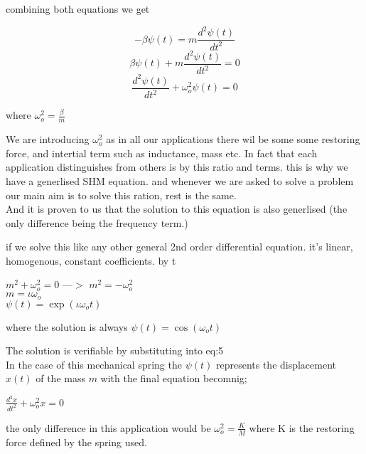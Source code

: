 \documentclass[12pt]{article}
\begin{document}
combining both equations we get

\begin{equation}
    -\beta \psi(t)  = m \frac{d^2 \psi(t)}{dt^2}
\end{equation}
\begin{equation}
    \beta \psi(t)  + m \frac{d^2 \psi(t)}{dt^2} = 0
\end{equation}
\begin{equation}
    \frac{d^2 \psi(t)}{dt^2} + \omega^2_o \psi(t) = 0
\end{equation}
\begin{center}
    where $ \omega^2_o = \frac{\beta}{m}$
\end{center}

We are introducing $ \omega^2_o$ as in all our applications there wil be some some restoring force, and intertial term such as inductance, mass etc.
In fact that each application distinguishes from others is by this ratio and terms. this is why we have a generlised SHM equation. and whenever we are asked to solve a problem our main aim is to solve this ration, rest is the same. \\

And it is proven to us that the solution to this equation is also generlised (the only difference being the frequency term.)

if we solve this like any other general 2nd order differential equation.
it's linear, homogenous, constant coefficients.
by t
\begin{center}
    $m^2 + \omega^2_o = 0$ ---$>$
    $m^2 = - \omega^2_o$ \\
    $m = \iota {\omega_o}$ \\
    $\psi(t) = \exp(\iota \omega_o t)$

\end{center}

where the solution is always $\psi(t) = \cos(\omega_o t)$

The solution is verifiable by substituting into eq:5\\

In the case of this mechanical spring the $\psi(t)$ represents the displacement $x(t)$
of the mass $m$ with the final equation becomnig;
\begin{center}

    $\frac{d^2x}{dt^2} + \omega^2_o x = 0$

\end{center}
the only difference in this application would be $\omega^2_o = \frac{K}{M}$
where K is the restoring force defined by the spring used.
\end{document}

